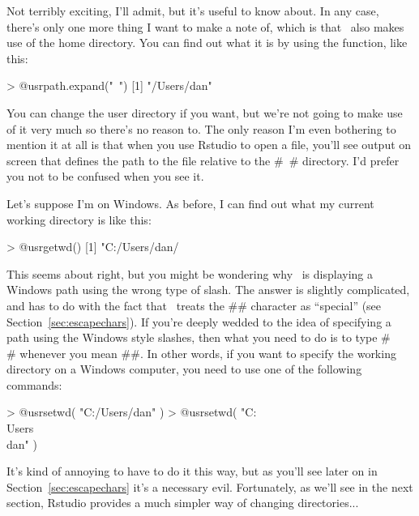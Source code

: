 Not terribly exciting, I'll admit, but it's useful to know about. In any case, there's only one more thing I want to make a note of, which is that \R\ also makes use of the home directory. You can find out what it is by using the  function, like this:
\begin{rblock1}
> @usr{path.expand("~")}
[1] "/Users/dan"
\end{rblock1}
You can change the user directory if you want, but we're not going to make use of it very much so there's no reason to. The only reason I'm even bothering to mention it at all is that when you use Rstudio to open a file, you'll see output on screen that defines the path to the file relative to  the \rtextverb#~# directory. I'd prefer you not to be confused when you see it.





Let's suppose I'm on Windows. As before, I can find out what my current working directory is like this:
\begin{rblock1}
> @usr{getwd()}
[1] "C:/Users/dan/
\end{rblock1}
This seems about right, but you might be wondering why \R\ is displaying a Windows path using the wrong type of slash. The answer is slightly complicated, and has to do with the fact that \R\ treats the \rtextverb#\# character as ``special'' (see Section~\ref{sec:escapechars}). If you're deeply wedded to the idea of specifying a path using the Windows style slashes, then what you need to do is to type \rtextverb#\\# whenever you mean \rtextverb#\#. In other words, if you want to specify the working directory on a Windows computer, you need to use one of the following commands:
\begin{rblock1}
> @usr{setwd( "C:/Users/dan" )}
> @usr{setwd( "C:\\Users\\dan" )}
\end{rblock1}
It's kind of annoying to have to do it this way, but as you'll see later on in Section~\ref{sec:escapechars} it's a necessary evil. Fortunately, as we'll see in the next section, Rstudio provides a much simpler way of changing directories...

